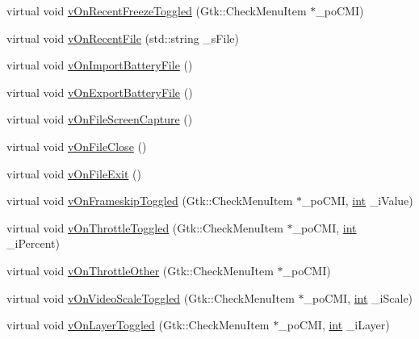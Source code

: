 \begin{DoxyCompactItemize}
\item 
virtual void \mbox{\hyperlink{class_v_b_a_1_1_window_aed773f053d4ab731d5a555dc940c0195}{v\+On\+Recent\+Freeze\+Toggled}} (Gtk\+::\+Check\+Menu\+Item $\ast$\+\_\+po\+C\+MI)
\item 
virtual void \mbox{\hyperlink{class_v_b_a_1_1_window_ab96850739fb7f53a370e6b6f059b87a9}{v\+On\+Recent\+File}} (std\+::string \+\_\+s\+File)
\item 
virtual void \mbox{\hyperlink{class_v_b_a_1_1_window_aa376015acdd7b7fe83a67bc1306d3553}{v\+On\+Import\+Battery\+File}} ()
\item 
virtual void \mbox{\hyperlink{class_v_b_a_1_1_window_a26d233092dd624a0bd3734ec0cdc0d7c}{v\+On\+Export\+Battery\+File}} ()
\item 
virtual void \mbox{\hyperlink{class_v_b_a_1_1_window_ae96308c56cf84f9c56dc97c196adc49c}{v\+On\+File\+Screen\+Capture}} ()
\item 
virtual void \mbox{\hyperlink{class_v_b_a_1_1_window_a9bb969481b9cfea3b5b5bc157ccc0ff6}{v\+On\+File\+Close}} ()
\item 
virtual void \mbox{\hyperlink{class_v_b_a_1_1_window_acf22a1b1a9e46ac71e466f160d4e672e}{v\+On\+File\+Exit}} ()
\item 
virtual void \mbox{\hyperlink{class_v_b_a_1_1_window_a1d969d55fcb1a69d13d3a29c9365e699}{v\+On\+Frameskip\+Toggled}} (Gtk\+::\+Check\+Menu\+Item $\ast$\+\_\+po\+C\+MI, \mbox{\hyperlink{_util_8cpp_a0ef32aa8672df19503a49fab2d0c8071}{int}} \+\_\+i\+Value)
\item 
virtual void \mbox{\hyperlink{class_v_b_a_1_1_window_a86f6a68bfbf9928605aa80a543d49038}{v\+On\+Throttle\+Toggled}} (Gtk\+::\+Check\+Menu\+Item $\ast$\+\_\+po\+C\+MI, \mbox{\hyperlink{_util_8cpp_a0ef32aa8672df19503a49fab2d0c8071}{int}} \+\_\+i\+Percent)
\item 
virtual void \mbox{\hyperlink{class_v_b_a_1_1_window_a3d2033ebb1a3ef25bada10bef93e856a}{v\+On\+Throttle\+Other}} (Gtk\+::\+Check\+Menu\+Item $\ast$\+\_\+po\+C\+MI)
\item 
virtual void \mbox{\hyperlink{class_v_b_a_1_1_window_af0072d4a223c1a543dd5ce0933a72804}{v\+On\+Video\+Scale\+Toggled}} (Gtk\+::\+Check\+Menu\+Item $\ast$\+\_\+po\+C\+MI, \mbox{\hyperlink{_util_8cpp_a0ef32aa8672df19503a49fab2d0c8071}{int}} \+\_\+i\+Scale)
\item 
virtual void \mbox{\hyperlink{class_v_b_a_1_1_window_aabcf3fafc945b040ac1f775cb32a7245}{v\+On\+Layer\+Toggled}} (Gtk\+::\+Check\+Menu\+Item $\ast$\+\_\+po\+C\+MI, \mbox{\hyperlink{_util_8cpp_a0ef32aa8672df19503a49fab2d0c8071}{int}} \+\_\+i\+Layer)

\end{DoxyCompactItemize}
